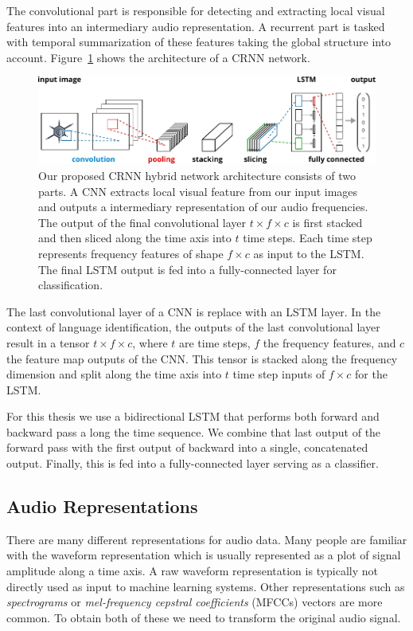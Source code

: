 The convolutional part is responsible for detecting and extracting local visual features into an intermediary audio representation. A recurrent part is tasked with temporal summarization of these features taking the global structure into account. Figure~\ref{fig:crnn} shows the architecture of a CRNN network. 
%
	\begin{figure}[]
  		\centering
    	\includegraphics[]{img/crnn3.pdf}
    	\caption{Our proposed CRNN hybrid network architecture consists of two parts. A CNN extracts local visual feature from our input images and outputs a intermediary representation of our audio frequencies. The output of the final convolutional layer $t \times f \times c$ is first stacked and then sliced along the time axis into $t$ time steps. Each time step represents  frequency features of shape $f \times c$ as input to the LSTM. The final LSTM output is fed into a fully-connected layer for classification.}
    	\label{fig:crnn}
	\end{figure}
	The last convolutional layer of a CNN is replace with an LSTM layer. In the context of language identification, the outputs of the last convolutional layer result in a tensor $t \times f \times c$, where $t$ are time steps, $f$ the frequency features, and $c$ the feature map outputs of the CNN. This tensor is stacked along the frequency dimension and split along the time axis into $t$ time step inputs of $ f \times c$ for the LSTM.
	
	For this thesis we use a bidirectional LSTM that performs both forward and backward pass a long the time sequence. We combine that last output of the forward pass with the first output of backward into a single, concatenated output. Finally, this is fed into a fully-connected layer serving as a classifier.
	
\subsection{Audio Representations}
There are many different representations for audio data. Many people are familiar with the waveform representation which is usually represented as a plot of signal amplitude along a time axis. A raw waveform representation is typically not directly used as input to machine learning systems.
Other representations such as \emph{spectrograms} or \emph{mel-frequency cepstral coefficients} (MFCCs) vectors are more common. To obtain both of these we need to transform the original audio signal.

